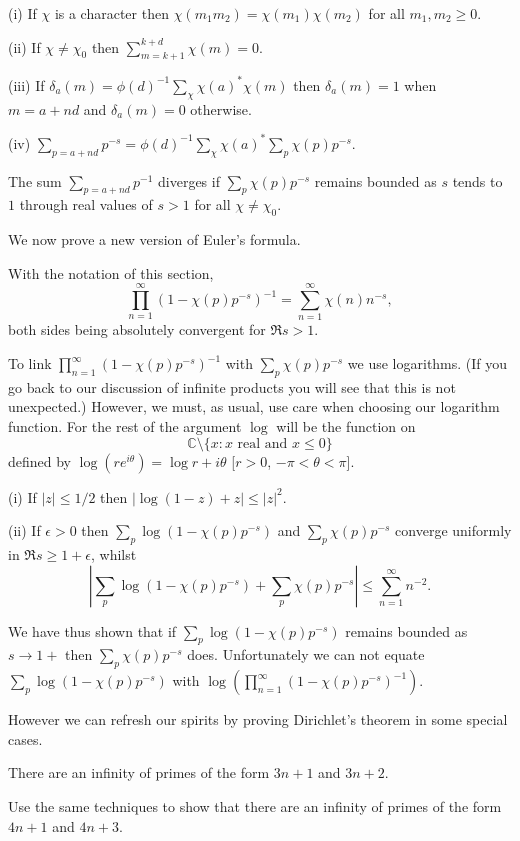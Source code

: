 \begin{lemma} (i) If $\chi$ is a character then
$\chi(m_{1}m_{2})=\chi(m_{1})\chi(m_{2})$
for all $m_{1},m_{2}\geq 0$.

(ii) If $\chi\neq\chi_{0}$ then
$\sum_{m=k+1}^{k+d}\chi(m)=0$.

(iii) If $\delta_{a}(m)=\phi(d)^{-1}\sum_{\chi}\chi(a)^{*}\chi(m)$
then $\delta_{a}(m)=1$ when $m=a+nd$ and $\delta_{a}(m)=0$
otherwise.

(iv) $\displaystyle{\sum_{p=a+nd}p^{-s}
=\phi(d)^{-1}\sum_{\chi}\chi(a)^{*}\sum_{p}\chi(p)p^{-s}}$.
\end{lemma}
\begin{lemma} The sum $\sum_{p=a+nd}p^{-1}$ diverges if
$\sum_{p}\chi(p)p^{-s}$ remains bounded
as $s$ tends to $1$ through real values of $s>1$
for all $\chi\neq\chi_{0}$.
\end{lemma}

We now prove a new version of Euler's formula.
\begin{theorem}
With the notation of this section,
\[\prod_{n=1}^{\infty}(1-\chi(p)p^{-s})^{-1}=
\sum_{n=1}^{\infty}\chi(n)n^{-s},\]
both sides being absolutely convergent for $\Re s>1$.
\end{theorem}
To link $\prod_{n=1}^{\infty}(1-\chi(p)p^{-s})^{-1}$
with $\sum_{p}\chi(p)p^{-s}$ we use logarithms.
(If you go back to our discussion of infinite products
you will see that this is not unexpected.) However,
we must, as usual, use care when choosing our logarithm
function. For the rest of the argument $\log$
will be the function on
\[{\mathbb C}\setminus\{x:\text{$x$ real and $x\leq 0$}\}\]
defined by $\log (re^{i\theta})=\log r+i\theta$
[$r>0$, $-\pi<\theta<\pi$].
\begin{lemma} (i) If $|z|\leq 1/2$  then $|\log(1-z)+z|\leq |z|^{2}$.

(ii) If $\epsilon>0$ then $\sum_{p}\log(1-\chi(p)p^{-s})$
and $\sum_{p}\chi(p)p^{-s}$ converge uniformly in 
$\Re s\geq 1+\epsilon$, whilst
\[\left|\sum_{p}\log(1-\chi(p)p^{-s})+\sum_{p}\chi(p)p^{-s}\right|
\leq \sum_{n=1}^{\infty}n^{-2}.\]
\end{lemma}

We have thus shown that if $\sum_{p}\log(1-\chi(p)p^{-s})$
remains bounded as $s\rightarrow 1+$  then $\sum_{p}\chi(p)p^{-s}$
does. Unfortunately we can not equate $\sum_{p}\log(1-\chi(p)p^{-s})$
with $\log(\prod_{n=1}^{\infty}(1-\chi(p)p^{-s})^{-1})$.

However we can refresh our spirits by proving Dirichlet's
theorem in some special cases.
\begin{example} There are an infinity of primes 
of the form $3n+1$ and $3n+2$.
\end{example}
\begin{exercise} Use the same techniques to show that
there are an infinity of primes 
of the form $4n+1$ and $4n+3$.
\end{exercise} 
